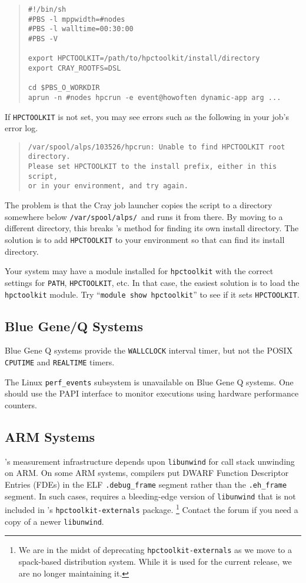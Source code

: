 \begin{quote}
\begin{verbatim}
#!/bin/sh
#PBS -l mppwidth=#nodes
#PBS -l walltime=00:30:00
#PBS -V

export HPCTOOLKIT=/path/to/hpctoolkit/install/directory
export CRAY_ROOTFS=DSL

cd $PBS_O_WORKDIR
aprun -n #nodes hpcrun -e event@howoften dynamic-app arg ...
\end{verbatim}
\end{quote}

If \verb|HPCTOOLKIT| is not set, you may see errors such as the
following in your job's error log.

\begin{quote}
\begin{verbatim}
/var/spool/alps/103526/hpcrun: Unable to find HPCTOOLKIT root directory.
Please set HPCTOOLKIT to the install prefix, either in this script,
or in your environment, and try again.
\end{verbatim}
\end{quote}

The problem is that the Cray job launcher copies the \hpcrun{}
script to a directory somewhere below \verb|/var/spool/alps/|\ and runs
it from there.  By moving \hpcrun{} to a different directory, this
breaks \hpcrun{}'s method for finding its own install directory.
The solution is to add \verb|HPCTOOLKIT| to your environment so that
\hpcrun{} can find its install directory.

Your system may have a module installed for \verb|hpctoolkit| with the
correct settings for \verb|PATH|, \verb|HPCTOOLKIT|, etc.  In that case,
the easiest solution is to load the \verb|hpctoolkit| module.  Try
``\verb|module show hpctoolkit|'' to see if it sets \verb|HPCTOOLKIT|.

\subsection{Blue Gene/Q Systems}
Blue Gene Q systems provide the \verb|WALLCLOCK| interval timer, but not the 
POSIX \verb|CPUTIME| and \verb|REALTIME| timers.

The Linux \verb|perf_events| subsystem is unavailable on Blue Gene Q systems. 
One should use the PAPI interface to monitor executions using hardware performance counters. 

\subsection{ARM Systems}
\HPCToolkit{}'s measurement infrastructure depends upon \verb|libunwind| for call stack unwinding on ARM.
On some ARM systems, compilers put DWARF Function Descriptor Entries (FDEs) in the ELF \verb|.debug_frame| segment rather 
than the \verb|.eh_frame| segment. In such cases, \HPCToolkit{} requires a bleeding-edge version of \verb|libunwind| that is not included in 
\HPCToolkit{}'s \verb|hpctoolkit-externals| package. 
\footnote{We are in the midst of deprecating {\tt hpctoolkit-externals} as we move to a spack-based distribution system. While it is used for the
current release, we are no longer maintaining it.}
Contact the \HPCToolkit{} forum if you need a copy of a newer \verb|libunwind|. 
